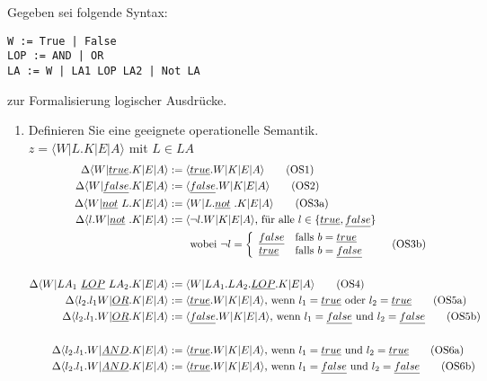 \documentclass[ngerman,a4paper]{report}
\begin{document}
Gegeben sei folgende Syntax:
\begin{lstlisting}
W := True | False
LOP := AND | OR
LA := W | LA1 LOP LA2 | Not LA
\end{lstlisting}
zur Formalisierung logischer Ausdrücke.
\begin{enumerate}
\item Definieren Sie eine geeignete operationelle Semantik.\\
$z=\langle W|L.K|E|A\rangle$ mit $L \in LA$
\begin{align}
\Delta\langle W|\underline{true}.K|E|A\rangle &:= \langle \underline{true}.W|K|E|A\rangle\tag{OS1}\\
\Delta\langle W|\underline{false}.K|E|A\rangle &:= \langle \underline{false}.W|K|E|A\rangle\tag{OS2}\\
\Delta\langle W|\underline{not}\  L.K|E|A\rangle &:= \langle W|L.\underline{not}\ .K|E|A\rangle\tag{OS3a}\\
\Delta\langle l.W|\underline{not}\ .K|E|A\rangle &:= \langle \neg l.W|K|E|A\rangle\text{, für alle }l\in \{\underline{true},\underline{false}\}\notag\\&\quad\quad\text{wobei }\neg l = \left\lbrace\begin{array}{l l}\underline{false}& \text{falls } b=\underline{true}\\\underline{true}& \text{falls } b=\underline{false}\\\end{array}\right.\tag{OS3b}\\\notag \\
\Delta\langle W|LA_1\ \underline{LOP}\ LA_2.K|E|A\rangle &:= \langle W|LA_1.LA_2.\underline{LOP}.K|E|A\rangle\tag{OS4}\\
\Delta\langle l_2.l_1W|\underline{OR}.K|E|A\rangle &:= \langle \underline{true}.W|K|E|A\rangle\text{, wenn }l_1=\underline{true}\text{ oder }l_2=\underline{true}\tag{OS5a}\\
\Delta\langle l_2.l_1.W|\underline{OR}.K|E|A\rangle &:= \langle \underline{false}.W|K|E|A\rangle\text{, wenn }l_1=\underline{false}\text{ und }l_2=\underline{false}\tag{OS5b}\\\notag \\
\Delta\langle l_2.l_1.W|\underline{AND}.K|E|A\rangle &:= \langle \underline{true}.W|K|E|A\rangle\text{, wenn }l_1=\underline{true}\text{ und }l_2=\underline{true}\tag{OS6a}\\
\Delta\langle l_2.l_1.W|\underline{AND}.K|E|A\rangle &:= \langle \underline{true}.W|K|E|A\rangle\text{, wenn }l_1=\underline{false}\text{ und }l_2=\underline{false}\tag{OS6b}\\

\end{align}
\end{enumerate}
\end{document}
